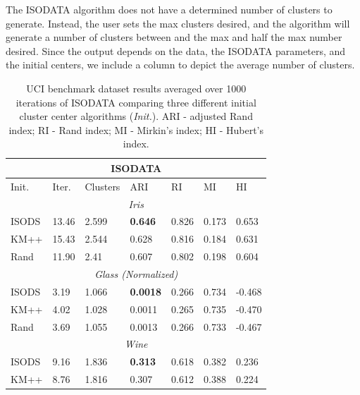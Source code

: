 \documentclass[a4paper, 10pt]{article}
\begin{document}
The ISODATA algorithm does not have a determined number of clusters to generate.
Instead, the user sets the max clusters desired, and the algorithm will generate
a number of clusters between and the max and half the max number desired. Since
the output depends on the data, the ISODATA parameters, and the initial centers,
we include a column to depict the average number of clusters.

\begin{table}[ht]
      \caption{UCI benchmark dataset results averaged over 1000 iterations of
            ISODATA comparing three different initial cluster center algorithms
            (\textit{Init.}). ARI - adjusted Rand index; RI - Rand index; MI -
            Mirkin's index; HI - Hubert's index.}
      \begin{tabular}{ |p{1.25cm}||p{1.25cm} p{1.25cm} p{1.25cm} p{1.25cm} p{1.25cm} p{1.25cm}|}
            \hline
            \multicolumn{7}{|c|}{\textbf{ISODATA}}                               \\
            \hline
            Init. & Iter.  & Clusters & ARI             & RI    & MI    & HI     \\
            \hline
            \multicolumn{7}{|c|}{\textit{Iris}}                                  \\
            \hline
            ISODS & 13.46  & 2.599    & \textbf{0.646}  & 0.826 & 0.173 & 0.653  \\
            KM++  & 15.43  & 2.544    & 0.628           & 0.816 & 0.184 & 0.631  \\
            Rand  & 11.90  & 2.41     & 0.607           & 0.802 & 0.198 & 0.604  \\
            \hline
            \multicolumn{7}{|c|}{\textit{Glass (Normalized)}}                    \\
            \hline
            ISODS & 3.19   & 1.066    & \textbf{0.0018} & 0.266 & 0.734 & -0.468 \\
            KM++  & 4.02   & 1.028    & 0.0011          & 0.265 & 0.735 & -0.470 \\
            Rand  & 3.69   & 1.055    & 0.0013          & 0.266 & 0.733 & -0.467 \\
            \hline
            \multicolumn{7}{|c|}{\textit{Wine}}                                  \\
            \hline
            ISODS & 9.16   & 1.836    & \textbf{0.313}  & 0.618 & 0.382 & 0.236  \\
            KM++  & 8.76   & 1.816    & 0.307           & 0.612 & 0.388 & 0.224  \\

\end{tabular}
\end{table}
\end{document}
